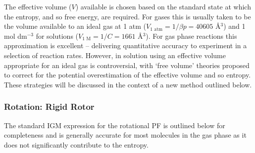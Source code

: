\documentclass[../main.tex]{subfiles}
\begin{document}
%

The effective volume ($V$) available is chosen based on the standard state at which the entropy, and so free energy, are required.\cite{Zhou2009} For gases this is usually taken to be the volume available to an ideal gas at 1 atm ($V_\text{1 atm} = 1 / \beta p= 40605$ \AA${}^3$) and 1 mol dm${}^{-3}$ for solutions ($V_\text{1 M} = 1/ C =  1661$ \AA${}^3$). For gas phase reactions this approximation is excellent -- delivering quantitative accuracy to experiment in a selection of reaction rates.\cite{Shan2019} However, in solution using an effective volume appropriate for an ideal gas is controversial, with `free volume' theories proposed to correct for the potential overestimation of the effective volume and so entropy.\cite{Amzel1997} These strategies will be discussed in the context of a new method outlined below.

\subsubsection{Rotation: Rigid Rotor}

The standard IGM expression for the rotational PF is outlined below for completeness and is generally accurate for most molecules in the gas phase as it does not significantly contribute to the entropy.



\end{document}
